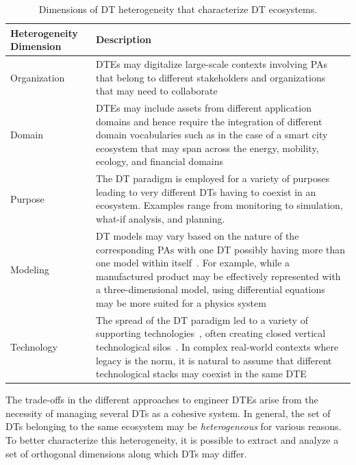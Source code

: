 \begin{table}[ht]
    \centering
    \footnotesize
    \renewcommand{\arraystretch}{1.1}
    \begin{tabularx}{\textwidth}{p{3cm}|X}
    \toprule
    \midrule
    \textbf{Heterogeneity \newline Dimension} & \textbf{Description} \\
    \hline
    \hline
    Organization &
    \acp{DTE} may digitalize large-scale contexts involving \acp{PA} that belong to different stakeholders and organizations that may need to collaborate~\cite{tripathi2024infsof}
    \\
    \hline
    Domain & 
    \acp{DTE} may include assets from different application domains and hence require the integration of different domain vocabularies such as in the case of a smart city ecosystem that may span across the energy, mobility, ecology, and financial domains~\cite{Deng_Zhang_Shen_2021}
    \\
    \hline
    Purpose &
    The \ac{DT} paradigm is employed for a variety of purposes~\cite{bulter2018geminiprinciples} leading to very different \acp{DT} having to coexist in an ecosystem. Examples range from monitoring to simulation, what-if analysis, and planning.
    \\
    \hline
    Modeling &
    \ac{DT} models may vary based on the nature of the corresponding \acp{PA} with one \ac{DT} possibly having more than one model within itself~\cite{qi2021enablingtechdt}.
    For example, while a manufactured product may be effectively represented with a three-dimensional model, using differential equations may be more suited for a physics system~\cite{bulter2018geminiprinciples}
    \\
    \hline
    Technology &
    The spread of the \ac{DT} paradigm led to a variety of supporting technologies~\cite{qi2021enablingtechdt}, often creating closed vertical technological silos~\cite{Damjanovic-Behrendt_Behrendt_2019}. In complex real-world contexts where legacy is the norm, it is natural to assume that different technological stacks may coexist in the same \ac{DTE}
    \\
    \hline
    \bottomrule
    \end{tabularx}
     \caption{Dimensions of \ac{DT} heterogeneity that characterize DT ecosystems.}
    \label{tab:heterogeneity}
\end{table}


The trade-offs in the different approaches to engineer \acp{DTE} arise from the necessity of managing several \acp{DT} as a cohesive system. 
%
In general, the set of \acp{DT} belonging to the same ecosystem may be \emph{heterogeneous} for various reasons.
To better characterize this heterogeneity, it is possible to extract and analyze a set of orthogonal dimensions along which \acp{DT} may differ.

